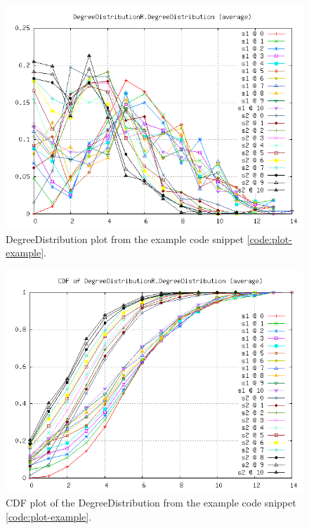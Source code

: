 \begin{figure} [h]
\centering
\includegraphics [scale=0.8] {images/plot_dist}
\caption{DegreeDistribution plot from the example code snippet \ref{code:plot-example}.}
\label{fig:plot_dist}
\end{figure}

\begin{figure} [h]
\centering
\includegraphics [scale=0.8] {images/plot_dist_cdf}
\caption{CDF plot of the DegreeDistribution from the example code snippet \ref{code:plot-example}.}
\label{fig:plot_dist_cdf}
\end{figure}

